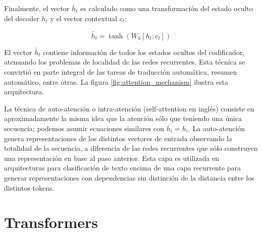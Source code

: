 Finalmente, el vector $\widetilde{h_t}$ es calculado como una transformación del estado oculto del decoder $h_t$ y el vector contextual $c_t$:


\begin{equation*}
    \widetilde{h_t} = \tanh(W_h [h_t; c_t])
\end{equation*}


El vector $\widetilde{h_t}$ contiene información de todos los estados ocultos del codificador, atenuando los problemas de localidad de las redes recurrentes. Esta técnica se convirtió en parte integral de las tareas de traducción automática, resumen automático, entre otras. La figura \ref{fig:attention_mechanism} ilustra esta arquitectura.

La técnica de auto-atención o intra-atención \cite{parikh-etal-2016-decomposable} (self-attention en inglés) consiste en aproximadamente la misma idea que la atención sólo que teniendo una única secuencia; podemos asumir ecuaciones similares con $\overline{h_i} = h_i$. La auto-atención genera representaciones de los distintos vectores de entrada observando la totalidad de la secuencia, a diferencia de las redes recurrentes que sólo construyen una representación en base al paso anterior. Esta capa es utilizada en arquitecturas para clasificación de texto encima de una capa recurrente para generar representaciones con dependencias sin distinción de la distancia entre los distintos tokens.

\section{Transformers}

